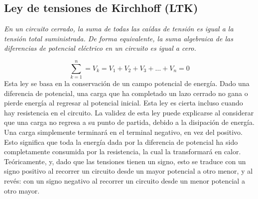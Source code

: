 \documentclass[a4paper,12pt]{report}
\begin{document}
\subsection{Ley de tensiones de Kirchhoff (LTK)}
\begin{center}
\textit{En un circuito cerrado, la suma de todas las caídas de tensión es igual a la tensión total suministrada. De forma equivalente, la suma algebraica de las diferencias de potencial eléctrico en un circuito es igual a cero.}
\end{center}
\begin{equation}
\sum_{k=1}^{n} = V_{k} = V_{1} + V_{2} + V_{3} + \ldots + V_{n} = 0
\end{equation}
Esta ley se basa en la conservación de un campo potencial de energía. Dado una diferencia de potencial, una carga que ha completado un lazo cerrado no gana o pierde energía al regresar al potencial inicial. Esta ley es cierta incluso cuando hay resistencia en el circuito. La validez de esta ley puede explicarse al considerar que una carga no regresa a su punto de partida, debido a la disipación de energía. Una carga simplemente terminará en el terminal negativo, en vez del positivo. Esto significa que toda la energía dada por la diferencia de potencial ha sido completamente consumida por la resistencia, la cual la transformará en calor. Teóricamente, y, dado que las tensiones tienen un signo, esto se traduce con un signo positivo al recorrer un circuito desde un mayor potencial a otro menor, y al revés: con un signo negativo al recorrer un circuito desde un menor potencial a otro mayor.
\end{document}

